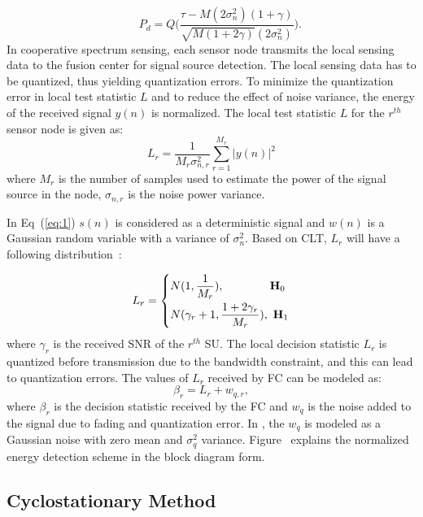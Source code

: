 \begin{equation}
\label{eq:4}
~~~~~~~P_d = Q\Bigg(\dfrac{\tau-M(2\sigma_n^2)(1+\gamma)}{\sqrt{M(1+2\gamma)}(2\sigma_n^2)}\Bigg).
\end{equation}
In cooperative spectrum sensing, each sensor node transmits the local sensing data to the fusion center for signal source detection. The local sensing data has to be quantized, thus yielding quantization errors. To minimize the quantization error in local test statistic $L$ and to reduce the effect of noise variance, the energy of the received signal $y(n)$ is normalized\cite{ref:13}. The local test statistic $L$ for the $r^{th}$ sensor node is given as:
\begin{equation}
	\label{eq:5}
	L_r = \dfrac{1}{M_r\sigma_{n,r}^2}\sum_{r=1}^{M_r}|y(n)|^2
\end{equation}
where $M_r$ is the number of samples used to estimate the power of the signal source in the node,  $\sigma_{n,r}$ is the noise power variance.

In Eq~(\ref{eq:1}) $s(n)$ is considered as a deterministic signal and $w(n)$ is a Gaussian random variable with a variance of $\sigma_n^2$. Based on CLT, $L_r$ will have a following distribution~\cite{inphtn7}:

\begin{equation}
	\label{eq:6}
	L_r = 
	\left\{
	\begin{aligned}
		& N(1,\dfrac{1}{M_r}),~~~~~~~~~~~~\mathbf{H}_0 \\
		& N(\gamma_r+1,\dfrac{1+2\gamma_r}{M_r}),~\mathbf{H}_1		
	\end{aligned}
	\right.
\end{equation}
where $\gamma_r$ is the received SNR of the $r^{th}$ SU. The local decision statistic $L_r$ is quantized before transmission due to the bandwidth constraint, and this can lead to quantization errors. The values of $L_r$ received by FC can be modeled as:
\begin{equation}
	\label{eq:7}
	 \beta_r = L_r + w_{q,r},
\end{equation}
where $\beta_r$ is the decision statistic received by the FC and $w_q$ is the noise added to the signal due to fading and quantization error. In \cite{arhtn14}, the $w_q$ is modeled as a Gaussian noise with zero mean and $\sigma_q^2$ variance. Figure~{} explains the normalized energy detection scheme in the block diagram form.

\subsection{Cyclostationary Method}


